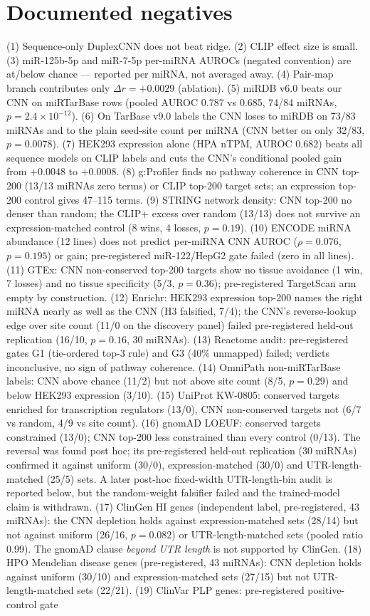 \documentclass[11pt]{article}
\begin{document}
\section{Documented negatives}
(1) Sequence-only DuplexCNN does not beat ridge. (2) CLIP effect size is small. (3) miR-125b-5p and miR-7-5p per-miRNA AUROCs (negated convention) are at/below chance --- reported per miRNA, not averaged away. (4) Pair-map branch contributes only $\Delta r=+0.0029$ (ablation). (5) miRDB v6.0 beats our CNN on miRTarBase rows (pooled AUROC 0.787 vs 0.685, 74/84 miRNAs, $p=2.4\times10^{-12}$). (6) On TarBase v9.0 labels the CNN loses to miRDB on 73/83 miRNAs and to the plain seed-site count per miRNA (CNN better on only 32/83, $p=0.0078$). (7) HEK293 expression alone (HPA nTPM, AUROC 0.682) beats all sequence models on CLIP labels and cuts the CNN's conditional pooled gain from $+0.0048$ to $+0.0008$. (8) g:Profiler finds no pathway coherence in CNN top-200 (13/13 miRNAs zero terms) or CLIP top-200 target sets; an expression top-200 control gives 47--115 terms. (9) STRING network density: CNN top-200 no denser than random; the CLIP+ excess over random (13/13) does not survive an expression-matched control (8 wins, 4 losses, $p=0.19$). (10) ENCODE miRNA abundance (12 lines) does not predict per-miRNA CNN AUROC ($\rho=0.076$, $p=0.195$) or gain; pre-registered miR-122/HepG2 gate failed (zero in all lines). (11) GTEx: CNN non-conserved top-200 targets show no tissue avoidance (1 win, 7 losses) and no tissue specificity (5/3, $p=0.36$); pre-registered TargetScan arm empty by construction. (12) Enrichr: HEK293 expression top-200 names the right miRNA nearly as well as the CNN (H3 falsified, 7/4); the CNN's reverse-lookup edge over site count (11/0 on the discovery panel) failed pre-registered held-out replication (16/10, $p=0.16$, 30 miRNAs). (13) Reactome audit: pre-registered gates G1 (tie-ordered top-3 rule) and G3 (40\% unmapped) failed; verdicts inconclusive, no sign of pathway coherence. (14) OmniPath non-miRTarBase labels: CNN above chance (11/2) but not above site count (8/5, $p=0.29$) and below HEK293 expression (3/10). (15) UniProt KW-0805: conserved targets enriched for transcription regulators (13/0), CNN non-conserved targets not (6/7 vs random, 4/9 vs site count). (16) gnomAD LOEUF: conserved targets constrained (13/0); CNN top-200 less constrained than every control (0/13). The reversal was found post hoc; its pre-registered held-out replication (30 miRNAs) confirmed it against uniform (30/0), expression-matched (30/0) and UTR-length-matched (25/5) sets. A later post-hoc fixed-width UTR-length-bin audit is reported below, but the random-weight falsifier failed and the trained-model claim is withdrawn. (17) ClinGen HI genes (independent label, pre-registered, 43 miRNAs): the CNN depletion holds against expression-matched sets (28/14) but not against uniform (26/16, $p=0.082$) or UTR-length-matched sets (pooled ratio 0.99). The gnomAD clause \emph{beyond UTR length} is not supported by ClinGen. (18) HPO Mendelian disease genes (pre-registered, 43 miRNAs): CNN depletion holds against uniform (30/10) and expression-matched sets (27/15) but not UTR-length-matched sets (22/21). (19) ClinVar PLP genes: pre-registered positive-control gate 
\end{document}
